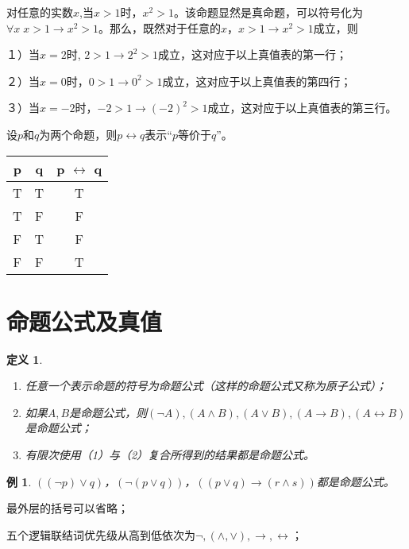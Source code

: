 \documentclass{article}
\newtheorem{Def}{定义}
\newtheorem*{Example}{例}
\begin{document}
\begin{CJK}{UTF8}{gbsn}
    对任意的实数$x$,当$x>1$时，$x^2 > 1$。该命题显然是真命题，可以符号化为$\forall x \; x > 1 \to x^2 > 1$。那么，既然对于任意的$x$，$x>1 \to x^2>1$成立，则

    １）当$x=2$时, $2 > 1 \to 2^2 >1$成立，这对应于以上真值表的第一行；

    ２）当$x=0$时，$0 > 1 \to 0^2 > 1$成立，这对应于以上真值表的第四行；

    ３）当$x=-2$时，$-2>1 \to (-2)^2 > 1$成立，这对应于以上真值表的第三行。
    
设$p$和$q$为两个命题，则$p\leftrightarrow q$表示“$p$等价于$q$”。  

  \begin{tabular}{cc|c}
    p& q& p $\leftrightarrow$ q\\
    \hline
    T&T&T\\
    T&F&F\\
    F&T&F\\
    F&F&T\\
  \end{tabular}

  \section{命题公式及真值}
  \begin{Def}
    \begin{enumerate}
      \item 任意一个表示命题的符号为命题公式（这样的命题公式又称为原子公式）；
      \item 如果$A,B$是命题公式，则$(\lnot A),(A\land B),(A\lor B),(A\to B),(A\leftrightarrow B)$是命题公式；
      \item 有限次使用（1）与（2）复合所得到的结果都是命题公式。
    \end{enumerate}
  \end{Def}
\begin{Example}
  $((\lnot p)\lor q)$，$(\lnot (p\lor q))$，$((p\lor q)\to (r\land s))$都是命题公式。
\end{Example}

最外层的括号可以省略；

五个逻辑联结词优先级从高到低依次为$\lnot, (\land, \lor), \to, \leftrightarrow$；


\end{CJK}
\end{document}
